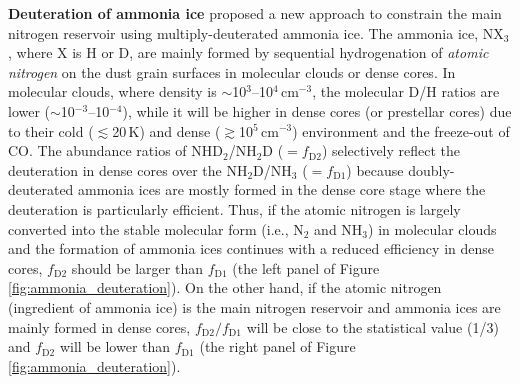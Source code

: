 \documentclass[12pt,a4paper]{article}  %
\begin{document}
\medskip
\noindent \textbf{Deuteration of ammonia ice} \quad  %
\citet{Furuya18} proposed a new approach to constrain the main nitrogen reservoir using multiply-deuterated ammonia ice. The ammonia ice, NX$_3$, where X is H or D, are mainly formed by sequential hydrogenation of \textit{atomic nitrogen} on the dust grain surfaces in molecular clouds or dense cores. 
In molecular clouds, where density is $\sim$10$^3$--10$^4$\,cm$^{-3}$, the molecular D/H ratios are lower ($\sim$10$^{-3}$--10$^{-4}$), while it will be higher in dense cores (or prestellar cores) due to their cold ($\lesssim$20\,K) and dense ($\gtrsim$10$^5$\,cm$^{-3}$) environment and the freeze-out of CO.
The abundance ratios of NHD$_2$/NH$_2$D ($=f_\mathrm{D2}$) selectively reflect the deuteration in dense cores over the NH$_2$D/NH$_3$ ($=f_\mathrm{D1}$) because doubly-deuterated ammonia ices are mostly formed in the dense core stage where the deuteration is particularly efficient. 
Thus, if the atomic nitrogen is largely converted into the stable molecular form (i.e., N$_2$ and NH$_3$) in molecular clouds and the formation of ammonia ices continues with a reduced efficiency in dense cores, $f_\mathrm{D2}$ should be larger than $f_\mathrm{D1}$ (the left panel of Figure \ref{fig:ammonia_deuteration}). On the other hand, if the atomic nitrogen (ingredient of ammonia ice) is the main nitrogen reservoir and ammonia ices are mainly formed in dense cores, $f_\mathrm{D2}/f_\mathrm{D1}$ will be close to the statistical value (1/3) and $f_\mathrm{D2}$ will be lower than $f_\mathrm{D1}$ (the right panel of Figure \ref{fig:ammonia_deuteration}).
\end{document}
